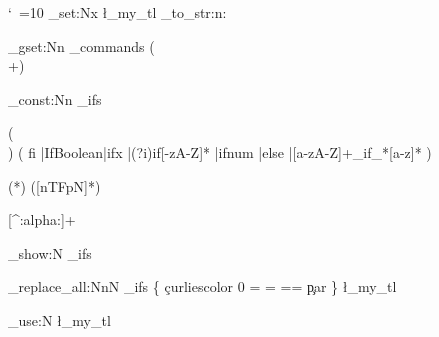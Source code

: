 \documentclass{article}
\begin{document}
\ExplSyntaxOn
\catcode`\ =10
\makeatletter
\tl_set:Nx \l_my_tl {\tl_to_str:n{\filename  \fi \ifx \fi:\else
} }

\def\ablack{\color{black}}
\def\acolor{\color{blue}}
\def\bcolor{\mdseries\color{black!80}}
\def\curliescolor{\color{purple}}
\def\greencolor{\color{blue}}

\regex_gset:Nn \regs_commands {(\\[a-z_\:]+)}

\regex_const:Nn \regs_ifs {
         
         (\\)
         ( %
	        fi%
	         |IfBoolean|ifx
	         |(?i)if[\@a-zA-Z]*
	         |ifnum
	         |else
	         |[a-zA-Z]+_if_*[a-z]*
	        )  
	        
	        (\:*) %
	        ([nTFpN]*) %
	        
	      [^:alpha:]+ %
	     }
	     


\regex_show:N \regs_ifs

\regex_replace_all:NnN 
	     { \regs_ifs        }
	     {
	       \cB\{ 
	        \c{curliescolor}%
	      0 =  = ==\4
	       \c{par}
	       \cE\}
	     }\l_my_tl
    
%	        

\ttfamily	     
	         
\tl_use:N \l_my_tl


\ExplSyntaxOff
\end{document}
